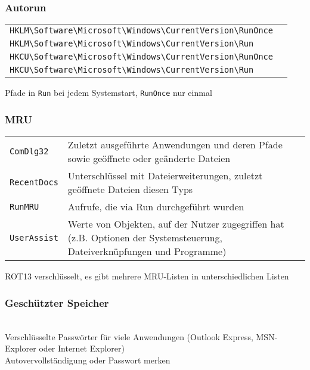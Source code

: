 \begin{multicols}{3}
\subsubsection{Autorun}
\begin{tabular}{@{}p{\the\MyLen}%
		@{}p{\linewidth-\the\MyLen}@{}}
	\texttt{HKLM\textbackslash Software\textbackslash Microsoft\textbackslash Windows\textbackslash CurrentVersion\textbackslash RunOnce} & \\
	\texttt{HKLM\textbackslash Software\textbackslash Microsoft\textbackslash Windows\textbackslash CurrentVersion\textbackslash Run} & \\
	\texttt{HKCU\textbackslash Software\textbackslash Microsoft\textbackslash Windows\textbackslash CurrentVersion\textbackslash RunOnce} & \\
	\texttt{HKCU\textbackslash Software\textbackslash Microsoft\textbackslash Windows\textbackslash CurrentVersion\textbackslash Run} & \\
\end{tabular}
Pfade in \texttt{Run} bei jedem Systemstart, \texttt{RunOnce} nur einmal

\subsubsection{MRU}
\texttt{}
\begin{tabular}{@{}p{\the\MyLen}%
		@{}p{\linewidth-\the\MyLen}@{}}
	\texttt{ComDlg32} & Zuletzt ausgeführte Anwendungen und deren Pfade sowie geöffnete oder geänderte Dateien\\
	 \texttt{RecentDocs} & Unterschlüssel mit Dateierweiterungen, zuletzt geöffnete Dateien diesen Typs\\
	 \texttt{RunMRU} & Aufrufe, die via Run durchgeführt wurden\\
	 \texttt{UserAssist} & Werte von Objekten, auf der Nutzer zugegriffen hat (z.B. Optionen der Systemsteuerung, Dateiverknüpfungen und Programme)
\end{tabular}
ROT13 verschlüsselt, es gibt mehrere MRU-Listen in unterschiedlichen Listen

\subsubsection{Geschützter Speicher}
\texttt{}\\
Verschlüsselte Passwörter für viele Anwendungen (Outlook Express, MSN-Explorer oder Internet Explorer)\\
Autovervollständigung oder Passwort merken\\


\end{multicols}
